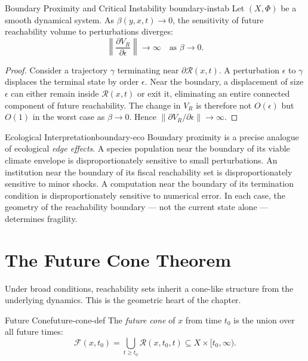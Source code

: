 \documentclass[12pt,twoside,openright]{book}
\newcommand{\reach}{\mathcal{R}}
\begin{document}
\begin{theorem}{Boundary Proximity and Critical Instability}%
  {boundary-instab}
  Let $(X,\Phi)$ be a smooth dynamical system. As
  $\beta(y,x,t)\to0$, the sensitivity of future
  reachability volume to perturbations diverges:
  \[
    \left\|\frac{\partial V_R}{\partial\epsilon}\right\|
    \to \infty \quad \text{as } \beta \to 0.
  \]
\end{theorem}

\begin{proof}
  Consider a trajectory $\gamma$ terminating near
  $\partial\reach(x,t)$. A perturbation $\epsilon$ to
  $\gamma$ displaces the terminal state by order $\epsilon$.
  Near the boundary, a displacement of size $\epsilon$ can
  either remain inside $\reach(x,t)$ or exit it, eliminating
  an entire connected component of future reachability. The
  change in $V_R$ is therefore not $O(\epsilon)$ but $O(1)$
  in the worst case as $\beta\to0$. Hence
  $\|\partial V_R/\partial\epsilon\|\to\infty$.
\end{proof}

\begin{remark}{Ecological Interpretation}{boundary-eco}
  Boundary proximity is a precise analogue of ecological
  \emph{edge effects}. A species population near the
  boundary of its viable climate envelope is
  disproportionately sensitive to small perturbations. An
  institution near the boundary of its fiscal reachability
  set is disproportionately sensitive to minor shocks. A
  computation near the boundary of its termination condition
  is disproportionately sensitive to numerical error. In
  each case, the geometry of the reachability boundary ---
  not the current state alone --- determines fragility.
\end{remark}

\section{The Future Cone Theorem}
\label{sec:ch13-future-cone}

Under broad conditions, reachability sets inherit a
cone-like structure from the underlying dynamics. This is
the geometric heart of the chapter.

\begin{definition}{Future Cone}{future-cone-def}
  The \emph{future cone} of $x$ from time $t_0$ is the union
  over all future times:
  \[
    \mathcal{F}(x,t_0) = \bigcup_{t\ge t_0} \reach(x,t_0,t)
    \subseteq X \times [t_0,\infty).
  \]
\end{definition}
\end{document}
